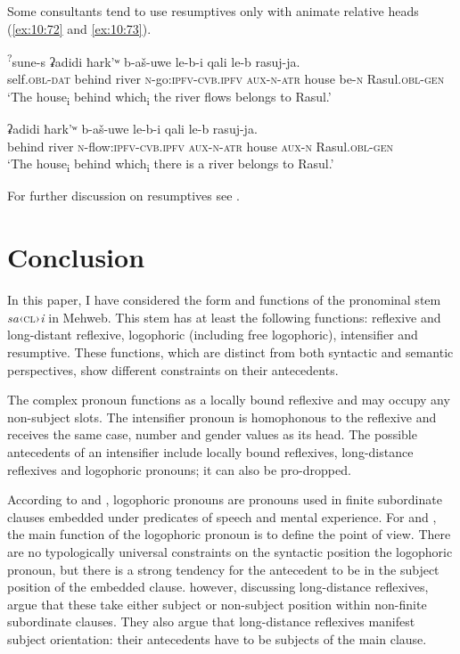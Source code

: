 ﻿\documentclass[output=paper]{langsci/langscibook}
\begin{document}
Some consultants tend to use resumptives only with animate relative
heads (\ref{ex:10:72} and \ref{ex:10:73}).

\ea \label{ex:10:72} %
\gll  \textsuperscript{?}sune-s ʡadidi ħark'ʷ b-aš-uwe le-b-i qali le-b rasuj-ja.\\
self.\textsc{obl}-\textsc{dat} behind river \textsc{n}-go:\textsc{ipfv}-\textsc{cvb.ipfv} \textsc{aux}-\textsc{n}-\textsc{atr} house {be}-\textsc{n} Rasul.\textsc{obl}-\textsc{gen}\\ 
\glt `The house\textsubscript{i} behind which\textsubscript{i} the river
flows belongs to Rasul.'

\ex \label{ex:10:73} %
\gll  ʡadidi ħark'ʷ b-aš-uwe le-b-i qali le-b rasuj-ja.\\
behind river \textsc{n}-flow:\textsc{ipfv}-\textsc{cvb.ipfv} \textsc{aux}-\textsc{n}-\textsc{atr} house \textsc{aux}-\textsc{n} Rasul.\textsc{obl}-\textsc{gen}\\ 
\glt `The house\textsubscript{i} behind which\textsubscript{i} there is a
river belongs to Rasul.'
\z

For further discussion on resumptives see \citet{lander-kozhukhar2015}.
%


\section{Conclusion}

In this paper, I have considered the form and functions of the
pronominal stem \emph{sa}‹\textsc{cl}›\emph{i} in Mehweb. This stem has
at least the following functions: reflexive and long-distant reflexive,
logophoric (including free logophoric), intensifier and resumptive.
These functions, which are distinct from both syntactic and semantic
perspectives, show different constraints on their antecedents.

The complex pronoun functions as a locally bound reflexive and may
occupy any non-subject slots. The intensifier pronoun is homophonous to
the reflexive and receives the same case, number and gender values as its
head. The possible antecedents of an intensifier include locally bound
reflexives, long-distance reflexives and logophoric pronouns; it can
also be pro-dropped.

According to \citet{reuland2011} and \citet{sells1987}, logophoric pronouns are
pronouns used in finite subordinate clauses embedded under predicates of
speech and mental experience. For \citet{clements1975} and \citet{toldova1999}, the
main function of the logophoric pronoun is to define the point of view.
There are no typologically universal constraints on the syntactic
position the logophoric pronoun, but there is a strong tendency for the
antecedent to be in the subject position of the embedded clause. \citet{cole-etal2000}
however, discussing long-distance reflexives, argue
that these take either subject or non-subject position within non-finite
subordinate clauses. They also argue that long-distance reflexives
manifest subject orientation: their antecedents have to be subjects of
the main clause.
\end{document}
